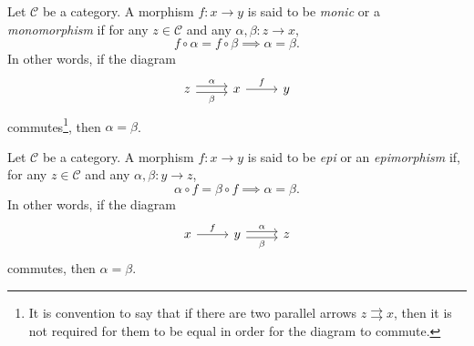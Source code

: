 \begin{definition}\label{4.10}
	Let $\mathcal{C} $ be a category. A morphism $f : x \to y$ is said to be \emph{monic} or a \emph{monomorphism} if for any $z\in \mathcal{C} $ and any $\alpha ,\beta : z \to x$,
	\[
		f\circ \alpha =f\circ \beta \implies \alpha =\beta 
	.\]
	In other words, if the diagram
	\[\begin{tikzcd}[row sep = 2.5em, column sep = 2.5em]
	z \ar[shift left, " \alpha  ", r] \ar[" \beta  "', shift right, r]  & x \ar[" f ", r]  & y
	\end{tikzcd}\]
	commutes\footnote{It is convention to say that if there are two parallel arrows $z\rightrightarrows x$, then it is not required for them to be equal in order for the diagram to commute.}, then $\alpha = \beta $.
\end{definition}
\begin{definition}\label{4.11}
	Let $\mathcal{C} $ be a category. A morphism $f : x \to y$ is said to be \emph{epi} or an \emph{epimorphism} if, for any $z\in \mathcal{C} $ and any $\alpha ,\beta : y \to z$,
	\[
		\alpha \circ f=\beta \circ f\implies \alpha =\beta 
	.\]
	In other words, if the diagram
	\[\begin{tikzcd}[row sep = 2.5em, column sep = 2.5em]
	x \ar[" f ", r]  & y \ar[" \alpha  ", shift left, r] \ar[" \beta  "', shift right, r]  & z
	\end{tikzcd}\]
	commutes, then $\alpha =\beta $.
\end{definition}


